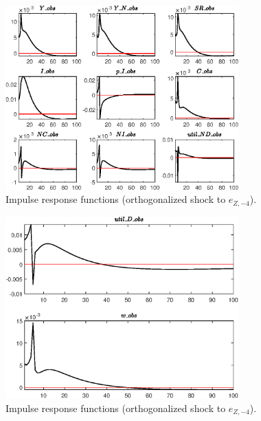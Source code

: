 \begin{figure}[H]
\centering 
\includegraphics[width=0.80\textwidth]{RBC_sectoral/graphs/RBC_sectoral_IRF_e_Z_news1}
\caption{Impulse response functions (orthogonalized shock to ${e_{Z,-4}}$).}\label{Fig:IRF:e_Z_news:1}
\end{figure}
 
\begin{figure}[H]
\centering 
\includegraphics[width=0.80\textwidth]{RBC_sectoral/graphs/RBC_sectoral_IRF_e_Z_news2}
\caption{Impulse response functions (orthogonalized shock to ${e_{Z,-4}}$).}\label{Fig:IRF:e_Z_news:2}
\end{figure}
 
